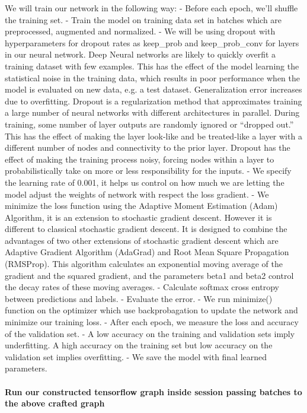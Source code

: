 \documentclass[11pt]{article}
\begin{document}
    We will train our network in the following way: - Before each epoch,
we'll shuffle the training set. - Train the model on training data set
in batches which are preprocessed, augmented and normalized. - We will
be using dropout with hyperparameters for dropout rates as keep\_prob
and keep\_prob\_conv for layers in our neural network. Deep Neural
networks are likely to quickly overfit a training dataset with few
examples. This has the effect of the model learning the statistical
noise in the training data, which results in poor performance when the
model is evaluated on new data, e.g. a test dataset. Generalization
error increases due to overfitting. Dropout is a regularization method
that approximates training a large number of neural networks with
different architectures in parallel. During training, some number of
layer outputs are randomly ignored or ``dropped out.'' This has the
effect of making the layer look-like and be treated-like a layer with a
different number of nodes and connectivity to the prior layer. Dropout
has the effect of making the training process noisy, forcing nodes
within a layer to probabilistically take on more or less responsibility
for the inputs. - We specify the learning rate of 0.001, it helps us
control on how much we are letting the model adjust the weights of
network with respect the loss gradient. - We minimize the loss function
using the Adaptive Moment Estimation (Adam) Algorithm, it is an
extension to stochastic gradient descent. However it is different to
classical stochastic gradient descent. It is designed to combine the
advantages of two other extensions of stochastic gradient descent which
are Adaptive Gradient Algorithm (AdaGrad) and Root Mean Square
Propagation (RMSProp). This algorithm calculates an exponential moving
average of the gradient and the squared gradient, and the parameters
beta1 and beta2 control the decay rates of these moving averages. -
Calculate softmax cross entropy between predictions and labels. -
Evaluate the error. - We run minimize() function on the optimizer which
use backprobagation to update the network and minimize our training
loss. - After each epoch, we measure the loss and accuracy of the
validation set. - A low accuracy on the training and validation sets
imply underfitting. A high accuracy on the training set but low accuracy
on the validation set implies overfitting. - We save the model with
final learned parameters.

    \paragraph{Run our constructed tensorflow graph inside session passing
batches to the above crafted
graph}\label{run-our-constructed-tensorflow-graph-inside-session-passing-batches-to-the-above-crafted-graph}
\end{document}
